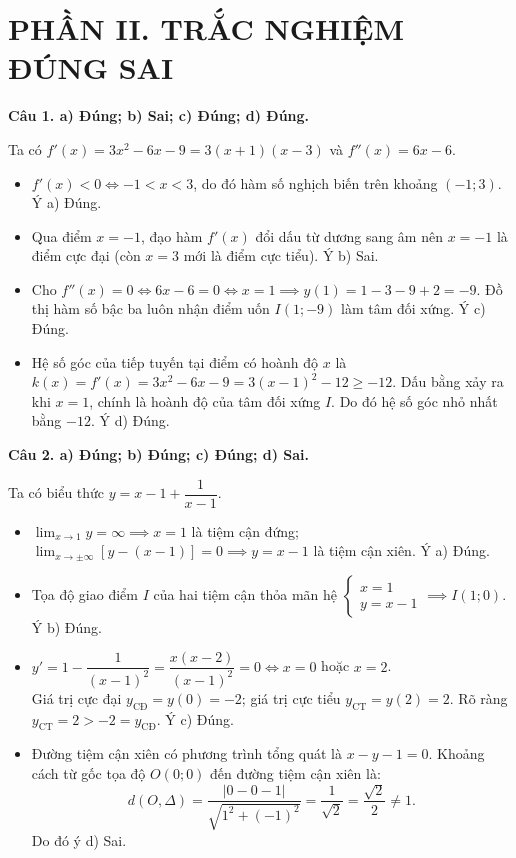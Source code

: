 \documentclass[12pt,a4paper]{article}
\newcommand{\loigiai}[1]{\par\medskip\Needspace{4\baselineskip}\noindent\textbf{#1}\par\nobreak}
\begin{document}
\section*{\large PHẦN II. TRẮC NGHIỆM ĐÚNG SAI}
\loigiai{Câu 1. a) Đúng; b) Sai; c) Đúng; d) Đúng.}
Ta có $f'(x) = 3x^2 - 6x - 9 = 3(x + 1)(x - 3)$ và $f''(x) = 6x - 6$.
\begin{itemize}
\item[a)] $f'(x) < 0 \iff -1 < x < 3$, do đó hàm số nghịch biến trên khoảng $(-1; 3)$. Ý a) Đúng.
\item[b)] Qua điểm $x = -1$, đạo hàm $f'(x)$ đổi dấu từ dương sang âm nên $x = -1$ là điểm cực đại (còn $x = 3$ mới là điểm cực tiểu). Ý b) Sai.
\item[c)] Cho $f''(x) = 0 \iff 6x - 6 = 0 \iff x = 1 \implies y(1) = 1 - 3 - 9 + 2 = -9$. Đồ thị hàm số bậc ba luôn nhận điểm uốn $I(1; -9)$ làm tâm đối xứng. Ý c) Đúng.
\item[d)] Hệ số góc của tiếp tuyến tại điểm có hoành độ $x$ là $k(x) = f'(x) = 3x^2 - 6x - 9 = 3(x - 1)^2 - 12 \ge -12$. Dấu bằng xảy ra khi $x = 1$, chính là hoành độ của tâm đối xứng $I$. Do đó hệ số góc nhỏ nhất bằng $-12$. Ý d) Đúng.
\end{itemize}

\loigiai{Câu 2. a) Đúng; b) Đúng; c) Đúng; d) Sai.}
Ta có biểu thức $y = x - 1 + \dfrac{1}{x - 1}$.
\begin{itemize}
\item[a)] $\displaystyle\lim_{x \to 1} y = \infty \implies x = 1$ là tiệm cận đứng; $\displaystyle\lim_{x \to \pm\infty} [y - (x - 1)] = 0 \implies y = x - 1$ là tiệm cận xiên. Ý a) Đúng.
\item[b)] Tọa độ giao điểm $I$ của hai tiệm cận thỏa mãn hệ $\begin{cases}x = 1\\y = x - 1\end{cases} \implies I(1; 0)$. Ý b) Đúng.
\item[c)] $y' = 1 - \dfrac{1}{(x-1)^2} = \dfrac{x(x-2)}{(x-1)^2} = 0 \iff x = 0$ hoặc $x = 2$.\\
Giá trị cực đại $y_{\text{CĐ}} = y(0) = -2$; giá trị cực tiểu $y_{\text{CT}} = y(2) = 2$. Rõ ràng $y_{\text{CT}} = 2 > -2 = y_{\text{CĐ}}$. Ý c) Đúng.
\item[d)] Đường tiệm cận xiên có phương trình tổng quát là $x - y - 1 = 0$. Khoảng cách từ gốc tọa độ $O(0; 0)$ đến đường tiệm cận xiên là:
\[d(O, \Delta) = \dfrac{|0 - 0 - 1|}{\sqrt{1^2 + (-1)^2}} = \dfrac{1}{\sqrt{2}} = \dfrac{\sqrt{2}}{2} \neq 1.\]
Do đó ý d) Sai.
\end{itemize}
\end{document}
